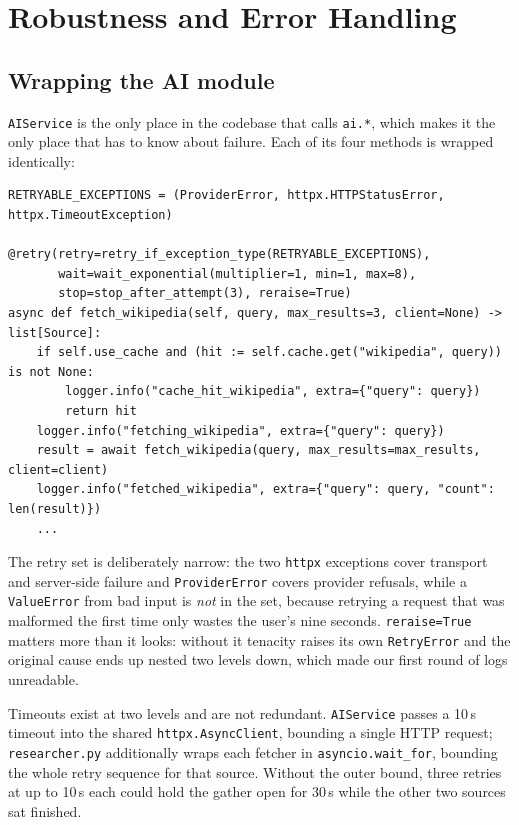 \documentclass[11pt,a4paper]{article}
\begin{document}
\section{Robustness and Error Handling}\label{sec:robustness}

\subsection{Wrapping the AI module}

\texttt{AIService} is the only place in the codebase that calls \texttt{ai.*}, which makes it
the only place that has to know about failure. Each of its four methods is wrapped identically:

\begin{lstlisting}[style=python]
RETRYABLE_EXCEPTIONS = (ProviderError, httpx.HTTPStatusError, httpx.TimeoutException)

@retry(retry=retry_if_exception_type(RETRYABLE_EXCEPTIONS),
       wait=wait_exponential(multiplier=1, min=1, max=8),
       stop=stop_after_attempt(3), reraise=True)
async def fetch_wikipedia(self, query, max_results=3, client=None) -> list[Source]:
    if self.use_cache and (hit := self.cache.get("wikipedia", query)) is not None:
        logger.info("cache_hit_wikipedia", extra={"query": query})
        return hit
    logger.info("fetching_wikipedia", extra={"query": query})
    result = await fetch_wikipedia(query, max_results=max_results, client=client)
    logger.info("fetched_wikipedia", extra={"query": query, "count": len(result)})
    ...
\end{lstlisting}

The retry set is deliberately narrow: the two \texttt{httpx} exceptions cover transport and
server-side failure and \texttt{ProviderError} covers provider refusals, while a
\texttt{ValueError} from bad input is \emph{not} in the set, because retrying a request that was
malformed the first time only wastes the user's nine seconds. \texttt{reraise=True} matters more
than it looks: without it tenacity raises its own \texttt{RetryError} and the original cause ends
up nested two levels down, which made our first round of logs unreadable.

Timeouts exist at two levels and are not redundant. \texttt{AIService} passes a 10\,s timeout
into the shared \texttt{httpx.AsyncClient}, bounding a single HTTP request; \texttt{researcher.py}
additionally wraps each fetcher in \texttt{asyncio.wait\_for}, bounding the whole retry sequence
for that source. Without the outer bound, three retries at up to 10\,s each could hold the gather
open for 30\,s while the other two sources sat finished.
\end{document}
